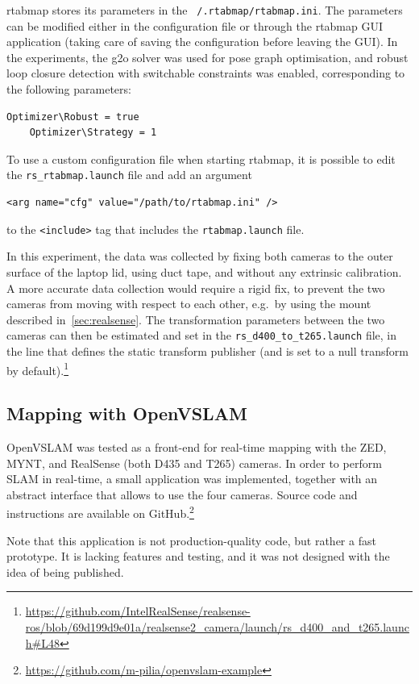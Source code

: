 \documentclass[11pt, letterpaper, twoside]{article}
\begin{document}
\gls{rtabmap} stores its parameters in the \texttt{~/.rtabmap/rtabmap.ini}. The
parameters can be modified either in the configuration file or through the
\gls{rtabmap} GUI application (taking care of saving the configuration before
leaving the GUI). In the experiments, the g2o solver was used for pose graph
optimisation, and robust loop closure detection with switchable constraints was
enabled, corresponding to the following parameters:
\begin{Verbatim}[samepage=true]
    Optimizer\Robust = true
    Optimizer\Strategy = 1
\end{Verbatim}
To use a custom configuration file when starting \gls{rtabmap}, it is possible
to edit the \texttt{rs\_rtabmap.launch} file and add an argument
\begin{Verbatim}[samepage=true]
    <arg name="cfg" value="/path/to/rtabmap.ini" />
\end{Verbatim}
to the \texttt{<include>} tag that includes the \texttt{rtabmap.launch} file.

In this experiment, the data was collected by fixing both cameras to the outer
surface of the laptop lid, using duct tape, and without any extrinsic
calibration. A more accurate data collection would require a rigid fix, to
prevent the two cameras from moving with respect to each other, e.g.\ by using
the mount described in~\cref{sec:realsense}. The transformation parameters
between the two cameras can then be estimated and set in the
\texttt{rs\_d400\_to\_t265.launch} file, in the line that defines the static
transform publisher (and is set to a null transform by
default).\footnote{\url{https://github.com/IntelRealSense/realsense-ros/blob/69d199d9e01a/realsense2_camera/launch/rs_d400_and_t265.launch\#L48}}

\subsection{Mapping with OpenVSLAM}\label{sec:openvslam-setup}

OpenVSLAM was tested as a front-end for real-time mapping with the ZED, MYNT,
and RealSense (both D435 and T265) cameras. In order to perform SLAM in
real-time, a small application was implemented, together with an abstract
interface that allows to use the four cameras. Source code and instructions are
available on GitHub.\footnote{\url{https://github.com/m-pilia/openvslam-example}}

Note that this application is not production-quality code, but rather a fast
prototype. It is lacking features and testing, and it was not designed with the
idea of being published.
\end{document}
